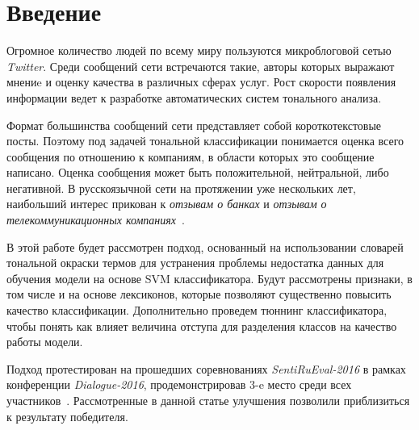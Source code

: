 \section{Введение}
Огромное количество людей по всему миру пользуются микроблоговой сетью
{\it Twitter}.
Среди сообщений сети встречаются такие, авторы которых выражают мнениe и оценку
качества в различных сферах услуг.
Рост скорости появления информации ведет к разработке автоматических систем
тонального анализа.

Формат большинства сообщений сети представляет собой короткотекстовые посты.
Поэтому под задачей тональной классификации понимается оценка всего
сообщения по отношению к компаниям, в области которых это сообщение написано.
Оценка сообщения может быть положительной, нейтральной, либо негативной.
В русскоязычной сети на протяжении уже нескольких лет, наибольший интерес прикован к
{\it отзывам о банках} и {\it отзывам о телекоммуникационных компаниях}~\cite{tonalityAnalysis}.

В этой работе будет рассмотрен подход, основанный на использовании
словарей тональной окраски термов для устранения проблемы недостатка
данных для обучения модели на основе SVM классификатора.
Будут рассмотрены признаки, в том числе и на основе лексиконов, которые позволяют
существенно повысить качество классификации.
Дополнительно проведем тюннинг классификатора, чтобы понять как влияет величина
отступа для разделения классов на качество работы модели.

Подход протестирован на прошедших соревнованиях {\it SentiRuEval-2016}
в рамках конференции {\it Dialogue-2016},
продемонстрировав 3-e место среди всех участников~\cite{dialog2016}.
Рассмотренные в данной статье улучшения позволили приблизиться к результату
победителя.
